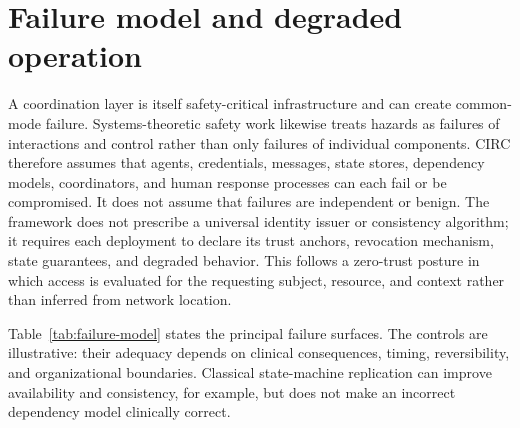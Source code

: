 \documentclass[10pt]{article}
\begin{document}
\section{Failure model and degraded operation}

A coordination layer is itself safety-critical infrastructure and can create common-mode failure.
Systems-theoretic safety work likewise treats hazards as failures of interactions and control rather
than only failures of individual components.\cite{leveson2004new} CIRC therefore assumes that agents,
credentials, messages, state stores, dependency models,
coordinators, and human response processes can each fail or be compromised. It does not assume that
failures are independent or benign. The framework does not prescribe a universal identity issuer or
consistency algorithm; it requires each deployment to declare its trust anchors, revocation mechanism,
state guarantees, and degraded behavior. This follows a zero-trust posture in which access is
evaluated for the requesting subject, resource, and context rather than inferred from network
location.\cite{rose2020zerotrust}

Table~\ref{tab:failure-model} states the principal failure surfaces. The controls are illustrative:
their adequacy depends on clinical consequences, timing, reversibility, and organizational boundaries.
Classical state-machine replication can improve availability and consistency, for example, but does
not make an incorrect dependency model clinically correct.\cite{schneider1990statemachine}
\end{document}
